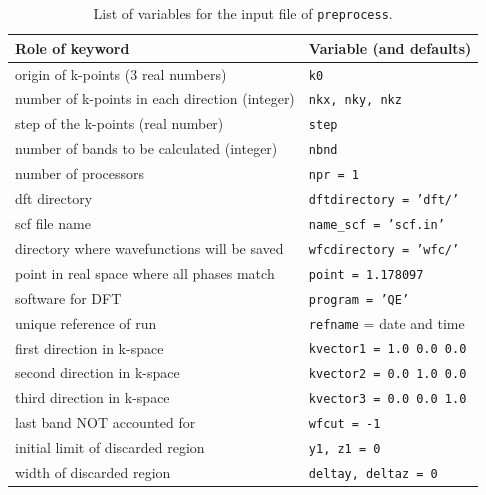 \documentclass[a4paper,12pt]{report}
\begin{document}
\newpage

\begin{table}[ht]
 \centering
 \caption{List of variables for the input file of \texttt{preprocess}.}

 \begin{tabularx}{\textwidth}{Xl}
 \textbf{Role of keyword}                     & \textbf{Variable (and defaults)}\\
\hline
 origin of k-points (3 real numbers)           & \texttt{k0} \\
 number of k-points in each direction (integer)& \texttt{nkx, nky, nkz} \\
 step of the k-points (real number)            & \texttt{step} \\
 number of bands to be calculated (integer)    & \texttt{nbnd} \\
 \hline
 number of processors                         & \texttt{npr = 1} \\
 dft directory                                & \texttt{dftdirectory = 'dft/'} \\
 scf file name                                & \texttt{name\_scf = 'scf.in'} \\
 directory where wavefunctions will be saved  & \texttt{wfcdirectory = 'wfc/'} \\
 point in real space where all phases match   & \texttt{point = 1.178097} \\
 software for DFT                             & \texttt{program = 'QE'} \\
 unique reference of run                      & \texttt{refname} = date and time \\
 first direction in k-space                   & \texttt{kvector1 = 1.0 0.0 0.0} \\
 second direction in k-space                  & \texttt{kvector2 = 0.0 1.0 0.0} \\
 third direction in k-space                   & \texttt{kvector3 = 0.0 0.0 1.0} \\
 last band NOT accounted for                  & \texttt{wfcut = -1} \\
 initial limit of discarded region             & \texttt{y1, z1 = 0} \\
 width of discarded region                    & \texttt{deltay, deltaz = 0} \\


 \hline
\end{tabularx}
 \label{tab:variables_preprocessing}
\end{table}
\end{document}
